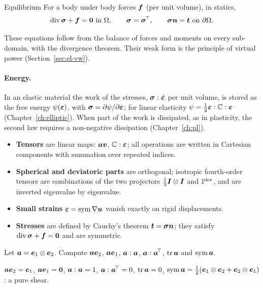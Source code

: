 \begin{gbox}{Equilibrium}
%
For a body under body forces $\bm{f}$ (per unit volume), in statics,
\[
  \operatorname{div}\bm{\sigma}+\bm{f}=\bm{0}\ \text{in }\Omega,\qquad \bm{\sigma}=\bm{\sigma}^{\!\top},\qquad
  \bm{\sigma}\bm{n}=\bm{t}\ \text{on }\partial\Omega .
\]
\end{gbox}
These equations follow from the balance of forces and moments on every
sub-domain, with the divergence theorem. Their weak form is the principle of
virtual power (Section~\ref{sec:el-vw}).

\paragraph{Energy.} In an elastic material the work of the stresses,
$\bm{\sigma}:\dot{\bm{\varepsilon}}$ per unit volume, is stored as the free energy
$\psi(\bm{\varepsilon})$, with $\bm{\sigma}=\partial\psi/\partial\bm{\varepsilon}$; for linear elasticity
$\psi=\tfrac12\bm{\varepsilon}:\mathbb{C}:\bm{\varepsilon}$ (Chapter~\ref{ch:elliptic}). When part of the
work is dissipated, as in plasticity, the second law requires a non-negative
dissipation (Chapter~\ref{ch:pl}).

\begin{gbox*}
\begin{itemize}
  \item \textbf{Tensors} are linear maps: $\bm{a}\bm{v}$, $\mathbb{C}:\bm{\varepsilon}$; all
  operations are written in Cartesian components with summation over
  repeated indices.
  \item \textbf{Spherical and deviatoric parts} are orthogonal; isotropic
  fourth-order tensors are combinations of the two projectors
  $\tfrac13\bm{I}\otimes\bm{I}$ and $\mathbb{I}^{\mathrm{dev}}$, and are inverted eigenvalue by eigenvalue.
  \item \textbf{Small strains} $\bm{\varepsilon}=\operatorname{sym}\nabla\bm{u}$ vanish exactly on rigid
  displacements.
  \item \textbf{Stresses} are defined by Cauchy's theorem $\bm{t}=\bm{\sigma}\bm{n}$; they
  satisfy $\operatorname{div}\bm{\sigma}+\bm{f}=\bm{0}$ and are symmetric.
\end{itemize}
\end{gbox*}


\label{exo:pre-contr}
Let $\bm{a}=\bm{e}_1\otimes\bm{e}_2$. Compute $\bm{a}\bm{e}_2$, $\bm{a}\bm{e}_1$,
$\bm{a}:\bm{a}$, $\bm{a}:\bm{a}^{\!\top}$, $\operatorname{tr}\bm{a}$ and $\operatorname{sym}\bm{a}$.
\begin{solution}
$\bm{a}\bm{e}_2=\bm{e}_1$, $\bm{a}\bm{e}_1=\bm{0}$, $\bm{a}:\bm{a}=1$,
$\bm{a}:\bm{a}^{\!\top}=0$, $\operatorname{tr}\bm{a}=0$,
$\operatorname{sym}\bm{a}=\tfrac12(\bm{e}_1\otimes\bm{e}_2+\bm{e}_2\otimes\bm{e}_1)$: a pure shear.
\end{solution}

